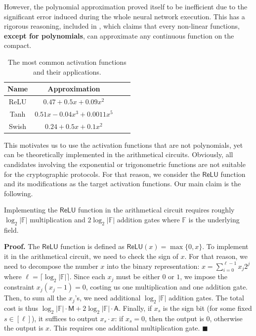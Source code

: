 \documentclass{iacrtrans}
\begin{document}
However, the polynomial approximation proved itself to be inefficient due 
to the significant error induced during the whole neural network execution. 
This has a rigorous reasoning, included in \cite{not-polynomials}, which 
claims that every non-linear functions, \textbf{except for polynomials},
can approximate any continuous function on the compact. 

\begin{table}[H]
    \centering
    \begin{tabular}{cccc}
        \hline
        \textbf{Name} & \textbf{Approximation} \\
        \hline
        ReLU & $0.47 + 0.5x + 0.09x^2$ \\
        Tanh & $0.51x - 0.04x^3 + 0.0011x^5$ \\
        Swish & $0.24 + 0.5x + 0.1x^2$\\
        \hline
    \end{tabular}
    \caption{The most common activation functions and their applications.}
    \label{table:activations-appr}
\end{table}

This motivates us to use the activation functions that are not polynomials, yet
can be theoretically implemented in the arithmetical circuits. Obviously, all
candidates involving the exponential or trigonometric functions are not suitable
for the cryptographic protocols. For that reason, we consider the
$\mathsf{ReLU}$ function and its modifications as the target activation
functions. Our main claim is the following.
\begin{proposition}
    Implementing the $\mathsf{ReLU}$ function in the arithmetical circuit 
    requires roughly $\log_2 |\mathbb{F}|$ multiplication and $2\log_2 |\mathbb{F}|$ addition gates 
    where $\mathbb{F}$ is the underlying field.
\end{proposition}

\textbf{Proof.} The $\mathsf{ReLU}$ function is defined as $\mathsf{ReLU}(x) =
\max\{0,x\}$. To implement it in the arithmetical circuit, we need to check the
sign of $x$. For that reason, we need to decompose the number $x$ into the
binary representation: $x = \sum_{i=0}^{\ell-1}x_j2^j$ where $\ell =
\lceil\log_2 |\mathbb{F}|\rceil$. Since each $x_j$ must be either $0$ or $1$, we
impose the constraint $x_j(x_j-1) = 0$, costing us one multiplication and one
addition gate. Then, to sum all the $x_j$'s, we need additional
$\log_2|\mathbb{F}|$ addition gates. The total cost is thus
$\log_2|\mathbb{F}|\cdot\mathsf{M} + 2\log_2|\mathbb{F}|\cdot\mathsf{A}$.
Finally, if $x_s$ is the sign bit (for some fixed $s \in [\ell]$), it suffices to
output $x_s \cdot x$: if $x_s = 0$, then the output is $0$, otherwise the output
is $x$. This requires one additional multiplication gate. $\blacksquare$
\end{document}
